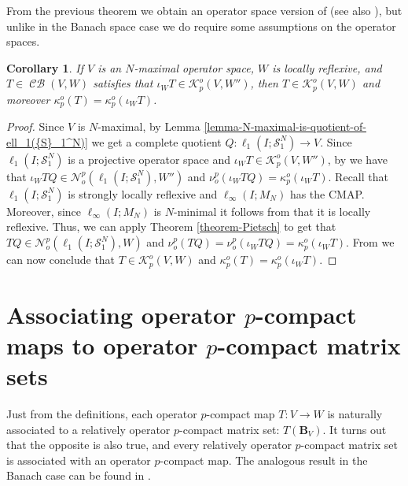 \documentclass[11pt]{amsart}
\DeclareMathOperator{\CB}{\mathcal{CB}}
\newtheorem{corollary}[theorem]{Corollary}
\numberwithin{equation}{section}
\begin{document}
From the previous theorem we obtain an operator space version of \cite[Cor. 2.6]{Galicer-Lassalle-Turco} (see also \cite[Cor. 3.6]{Delgado-Pineiro-Serrano-adjoints}), but unlike in the Banach space case we do require some assumptions on the operator spaces.

\begin{corollary}\label{cor-compactness-in-the-bidual-for-operators}
If $V$ is an $N$-maximal operator space, $W$ is locally reflexive, and $T\in\CB(V,W)$ satisfies that $\iota_WT\in\mathcal{K}_p^o(V,W'')$, then  $T\in\mathcal{K}_p^o(V,W)$ and moreover $\kappa_p^o(T) = \kappa_p^o(\iota_WT)$.
\end{corollary}

\begin{proof}
Since $V$ is $N$-maximal, by Lemma \ref{lemma-N-maximal-is-quotient-of-ell_1({S}_1^N)} we get a complete quotient $Q : \ell_1(I;\mathcal{S}_1^N) \to V$.
Since $\ell_1(I;\mathcal{S}_1^N)$ is a projective operator space and $\iota_WT\in\mathcal{K}_p^o(V,W'')$, by \cite[Prop. 3.7]{ChaDiGa-Operator-p-compact} we have that $\iota_WTQ \in\mathcal{N}_o^p(\ell_1(I;\mathcal{S}_1^N),W'')$ and $\nu_o^p(\iota_WTQ) = \kappa_p^o(\iota_WT)$.
Recall that $\ell_1(I;\mathcal{S}_1^N)$ is strongly locally reflexive  and  $\ell_\infty(I;M_N)$ has the CMAP.
Moreover, since $\ell_\infty(I;M_N)$ is $N$-minimal it follows from \cite[Prop. 18.4]{Pisier-OS-theory} that it is locally reflexive.
Thus, we can apply Theorem \ref{theorem-Pietsch} to get that  $TQ \in\mathcal{N}_o^p(\ell_1(I;\mathcal{S}_1^N),W)$ and $\nu_o^p(TQ) = \nu_o^p(\iota_WTQ) = \kappa_p^o(\iota_WT)$.
From \cite[Prop. 3.8]{ChaDiGa-Operator-p-compact} we can now conclude that $T\in\mathcal{K}_p^o(V,W)$ and $\kappa_p^o(T)= \kappa_p^o(\iota_WT)$. 
\end{proof}
\section{Associating operator $p$-compact maps to operator $p$-compact matrix sets} \label{sec: associating}



Just from the definitions, each operator $p$-compact map $T: V \to W$ is naturally associated to a relatively operator $p$-compact matrix set: $T(\mathbf{B}_V)$.
It turns out that the opposite is also true, and every relatively operator $p$-compact matrix set is associated with an operator $p$-compact map.
The analogous result in the Banach case can be found in \cite[Prop. 3.5]{Delgado-Pineiro-Serrano-adjoints}.
\end{document}
